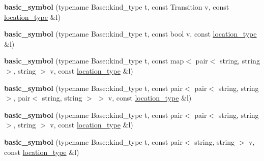 \begin{DoxyCompactItemize}
\item 
{\bfseries basic\+\_\+symbol} (typename Base\+::kind\+\_\+type t, const Transition v, const \hyperlink{classyy_1_1spec__parser_aeb5b1e66f65306eca737db5dfa61590d}{location\+\_\+type} \&l)\hypertarget{structyy_1_1spec__parser_1_1basic__symbol_aa1a371d0ffab0c954ca5a5f3f984e778}{}\label{structyy_1_1spec__parser_1_1basic__symbol_aa1a371d0ffab0c954ca5a5f3f984e778}

\item 
{\bfseries basic\+\_\+symbol} (typename Base\+::kind\+\_\+type t, const bool v, const \hyperlink{classyy_1_1spec__parser_aeb5b1e66f65306eca737db5dfa61590d}{location\+\_\+type} \&l)\hypertarget{structyy_1_1spec__parser_1_1basic__symbol_a811a019f0217568438d3798c466a1878}{}\label{structyy_1_1spec__parser_1_1basic__symbol_a811a019f0217568438d3798c466a1878}

\item 
{\bfseries basic\+\_\+symbol} (typename Base\+::kind\+\_\+type t, const map$<$ pair$<$ string, string $>$, string $>$ v, const \hyperlink{classyy_1_1spec__parser_aeb5b1e66f65306eca737db5dfa61590d}{location\+\_\+type} \&l)\hypertarget{structyy_1_1spec__parser_1_1basic__symbol_aea06367711008399b49e52b3bb72edc9}{}\label{structyy_1_1spec__parser_1_1basic__symbol_aea06367711008399b49e52b3bb72edc9}

\item 
{\bfseries basic\+\_\+symbol} (typename Base\+::kind\+\_\+type t, const pair$<$ pair$<$ string, string $>$, pair$<$ string, string $>$ $>$ v, const \hyperlink{classyy_1_1spec__parser_aeb5b1e66f65306eca737db5dfa61590d}{location\+\_\+type} \&l)\hypertarget{structyy_1_1spec__parser_1_1basic__symbol_a120e498fbde851cac61a910eaf02dd1b}{}\label{structyy_1_1spec__parser_1_1basic__symbol_a120e498fbde851cac61a910eaf02dd1b}

\item 
{\bfseries basic\+\_\+symbol} (typename Base\+::kind\+\_\+type t, const pair$<$ pair$<$ string, string $>$, string $>$ v, const \hyperlink{classyy_1_1spec__parser_aeb5b1e66f65306eca737db5dfa61590d}{location\+\_\+type} \&l)\hypertarget{structyy_1_1spec__parser_1_1basic__symbol_aaa2f35847167c3b52e1a6557e5f7bc0c}{}\label{structyy_1_1spec__parser_1_1basic__symbol_aaa2f35847167c3b52e1a6557e5f7bc0c}

\item 
{\bfseries basic\+\_\+symbol} (typename Base\+::kind\+\_\+type t, const pair$<$ string, string $>$ v, const \hyperlink{classyy_1_1spec__parser_aeb5b1e66f65306eca737db5dfa61590d}{location\+\_\+type} \&l)\hypertarget{structyy_1_1spec__parser_1_1basic__symbol_a7e823dfd9faef9bb296b56828a7bfcc5}{}\label{structyy_1_1spec__parser_1_1basic__symbol_a7e823dfd9faef9bb296b56828a7bfcc5}


\end{DoxyCompactItemize}
